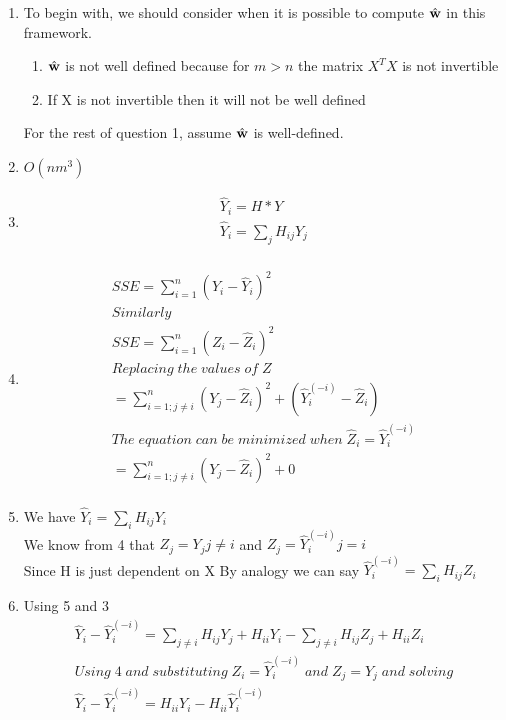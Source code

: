 \begin{enumerate}

\item To begin with, we should consider when it is possible to compute $\hat{\mathbf{w}}$ in this framework.
	\begin{enumerate}
	\item 	$\hat{\mathbf{w}}$ is not well defined because for $ m>n$ the matrix ${X^T}X$ is not invertible	

	\item	If X is not invertible then it will not be well defined
	\end{enumerate}
For the rest of question 1, assume $\hat{\mathbf{w}}$ is well-defined.

\item  $O(nm^3)$

  
\item 
\begin{align*}
	\hat{Y}_i = H * Y \\
	\hat{Y}_i = \sum_j H_{ij} Y_j\\	
\end{align*}


\item 
\begin{align*}
	SSE = \sum\limits_{i=1}^n \left( Y_i - \hat{Y}_i \right)^2 \\
	 Similarly \\
	SSE = \sum\limits_{i=1}^n \left( Z_i - \hat{Z}_i \right)^2 \\	
	Replacing\; the \; values\; of \; Z \; \\
	= \sum\limits_{i=1; j\neq i}^{n} \left(Y_j - \hat{Z}_i \right)^2 + \left(\hat{Y}_i^{(-i)} -  \hat{Z}_i \right) \\
	The \;equation \;can \;be \;minimized \;when \; \hat{Z}_i = \hat{Y}_i^{(-i)}\\
	= \sum\limits_{i=1; j\neq i}^{n} \left(Y_j - \hat{Z}_i \right)^2  + 0 \\
\end{align*}


\item   We have $\hat{Y}_i = \sum_i H_{ij} Y_i$ \\
We know from 4 that $Z_j = Y_j  j \neq i$ and $Z_j = \hat{Y}_i^{(-i)}  j = i$\\
Since H is just dependent on X
By analogy we can say  $\hat{Y}_i^{(-i)} =  \sum_i H_{ij} Z_i$ \\

\item Using 5 and 3
\begin{align*}
\hat{Y}_i - \hat{Y}_i^{(-i)} = \sum_{j \neq i} H_{ij} Y_j + H_{ii}Y_i - \sum_{j \neq i} H_{ij} Z_j + H_{ii}Z_i  \\
Using\;4  \; and \;substituting\; Z_i = \hat{Y}_i^{(-i)}\; and \;Z_j = Y_j \; and \;solving\\
\hat{Y}_i - \hat{Y}_i^{(-i)} = H_{ii}Y_{i} - H_{ii}\hat{Y}_i^{(-i)}
\end{align*}


\end{enumerate}
